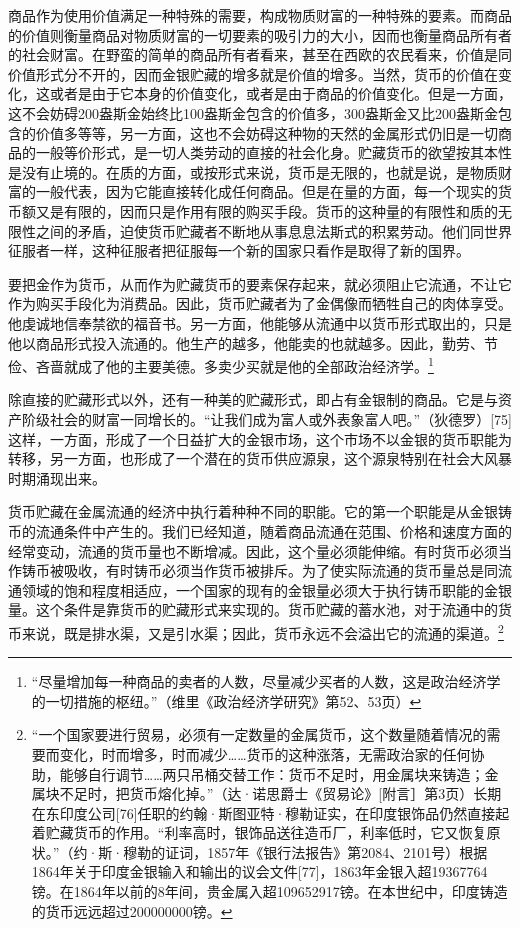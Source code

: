 \documentclass{ctexbook}
\begin{document}
        商品作为使用价值满足一种特殊的需要，构成物质财富的一种特殊的要素。而商品的价值则衡量商品对物质财富的一切要素的吸引力的大小，因而也衡量商品所有者的社会财富。在野蛮的简单的商品所有者看来，甚至在西欧的农民看来，价值是同价值形式分不开的，因而金银贮藏的增多就是价值的增多。当然，货币的价值在变化，这或者是由于它本身的价值变化，或者是由于商品的价值变化。但是一方面，这不会妨碍200盎斯金始终比100盎斯金包含的价值多，300盎斯金又比200盎斯金包含的价值多等等，另一方面，这也不会妨碍这种物的天然的金属形式仍旧是一切商品的一般等价形式，是一切人类劳动的直接的社会化身。贮藏货币的欲望按其本性是没有止境的。在质的方面，或按形式来说，货币是无限的，也就是说，是物质财富的一般代表，因为它能直接转化成任何商品。但是在量的方面，每一个现实的货币额又是有限的，因而只是作用有限的购买手段。货币的这种量的有限性和质的无限性之间的矛盾，迫使货币贮藏者不断地从事息息法斯式的积累劳动。他们同世界征服者一样，这种征服者把征服每一个新的国家只看作是取得了新的国界。

        要把金作为货币，从而作为贮藏货币的要素保存起来，就必须阻止它流通，不让它作为购买手段化为消费品。因此，货币贮藏者为了金偶像而牺牲自己的肉体享受。他虔诚地信奉禁欲的福音书。另一方面，他能够从流通中以货币形式取出的，只是他以商品形式投入流通的。他生产的越多，他能卖的也就越多。因此，勤劳、节俭、吝啬就成了他的主要美德。多卖少买就是他的全部政治经济学。\footnote{“尽量增加每一种商品的卖者的人数，尽量减少买者的人数，这是政治经济学的一切措施的枢纽。”（维里《政治经济学研究》第52、53页）}

        除直接的贮藏形式以外，还有一种美的贮藏形式，即占有金银制的商品。它是与资产阶级社会的财富一同增长的。“让我们成为富人或外表象富人吧。”（狄德罗）[75]这样，一方面，形成了一个日益扩大的金银市场，这个市场不以金银的货币职能为转移，另一方面，也形成了一个潜在的货币供应源泉，这个源泉特别在社会大风暴时期涌现出来。

        货币贮藏在金属流通的经济中执行着种种不同的职能。它的第一个职能是从金银铸币的流通条件中产生的。我们已经知道，随着商品流通在范围、价格和速度方面的经常变动，流通的货币量也不断增减。因此，这个量必须能伸缩。有时货币必须当作铸币被吸收，有时铸币必须当作货币被排斥。为了使实际流通的货币量总是同流通领域的饱和程度相适应，一个国家的现有的金银量必须大于执行铸币职能的金银量。这个条件是靠货币的贮藏形式来实现的。货币贮藏的蓄水池，对于流通中的货币来说，既是排水渠，又是引水渠；因此，货币永远不会溢出它的流通的渠道。\footnote{“一个国家要进行贸易，必须有一定数量的金属货币，这个数量随着情况的需要而变化，时而增多，时而减少……货币的这种涨落，无需政治家的任何协助，能够自行调节……两只吊桶交替工作：货币不足时，用金属块来铸造；金属块不足时，把货币熔化掉。”（达·诺思爵士《贸易论》[附言］第3页）长期在东印度公司[76]任职的约翰·斯图亚特·穆勒证实，在印度银饰品仍然直接起着贮藏货币的作用。“利率高时，银饰品送往造币厂，利率低时，它又恢复原状。”（约·斯·穆勒的证词，1857年《银行法报告》第2084、2101号）根据1864年关于印度金银输入和输出的议会文件[77]，1863年金银入超19367764镑。在1864年以前的8年间，贵金属入超109652917镑。在本世纪中，印度铸造的货币远远超过200000000镑。}
\end{document}
